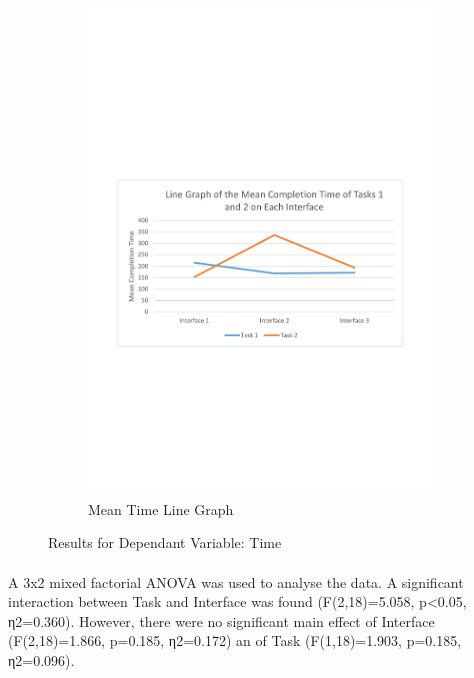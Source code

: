 \documentclass{l4proj}
\begin{document}
{\begin{figure}[H]
\begin{subfigure}{.5\textwidth}
		\includegraphics[width=\textwidth]{charts/table2.pdf}
		\caption{Mean Time Line Graph}
		\label{ch:meantimelinegraph}
	\end{subfigure}
	\caption{Results for Dependant Variable: Time}
	\label{fig:time}
\end{figure}

\paragraph{}
A 3x2 mixed factorial ANOVA was used to analyse the data. A significant interaction between Task and Interface was found (F(2,18)=5.058, p<0.05, η2=0.360). However, there were no significant main effect of Interface (F(2,18)=1.866, p=0.185, η2=0.172) an of Task (F(1,18)=1.903, p=0.185, η2=0.096). 
}
\end{document}
